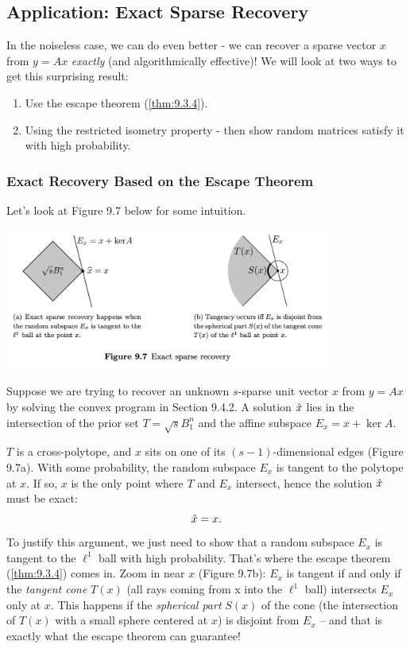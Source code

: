 \subsection{Application: Exact Sparse Recovery}
In the noiseless case, we can do even better - we can recover a sparse vector $x$ from $y = Ax$ \textit{exactly} 
(and algorithmically effective)! We will look at two ways to get this surprising result:
\begin{enumerate}
	\item Use the escape theorem (\cref{thm:9.3.4}).
	\item Using the restricted isometry property - then show random matrices satisfy it with high probability.
\end{enumerate}


\subsubsection{Exact Recovery Based on the Escape Theorem}
Let's look at Figure 9.7 below for some intuition.

\begin{center}
	\includegraphics[width=0.8\textwidth]{Chapter 9/fig9-7.png}
\end{center}

Suppose we are trying to recover an unknown $s$-sparse unit vector $x$ from $y=Ax$ by solving the convex program 
in Section 9.4.2. A solution $\Hat{x}$ lies in the intersection of the prior set $T = \sqrt{s}B_1^n$ and the 
affine subspace $E_x = x + \ker{A}$.

$T$ is a cross-polytope, and $x$ sits on one of its $(s-1)$-dimensional edges (Figure 9.7a). With some 
probability, the random subspace $E_x$ is tangent to the polytope at $x$. If so, $x$ is the only point where 
$T$ and $E_x$ intersect, hence the solution $\Hat{x}$ must be exact:
\[ \Hat{x} = x. \]
To justify this argument, we just need to show that a random subspace $E_x$ is tangent to the $\ell^1$ ball 
with high probability. That's where the escape theorem (\cref{thm:9.3.4}) comes in. Zoom in near $x$
(Figure 9.7b): $E_x$ is tangent if and only if the \textit{tangent cone} $T(x)$ (all rays coming from x into 
the $\ell^1$ ball) intersects $E_x$ only at $x$. This happens if the \textit{spherical part} $S(x)$ of the 
cone (the intersection of $T(x)$ with a small sphere centered at $x$) is disjoint from $E_x$ – and that is 
exactly what the escape theorem can guarantee!

